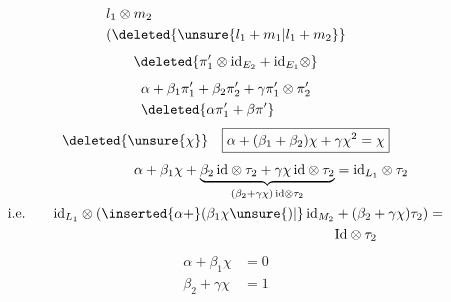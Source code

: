 \[
\begin{aligned}
&l_1\otimes m_2\\
&(\deleted{\unsure{l_1+m_1|l_1+m_2}}
\end{aligned}
\]
\[
\deleted{\pi'_1\otimes\mathrm{id}_{E_2}+\mathrm{id}_{E_1}\otimes}
\]
\[
\begin{aligned}
&\alpha+\beta_1\pi'_1+\beta_2\pi'_2+\gamma\pi'_1\otimes\pi'_2\\
&\deleted{\alpha\pi'_1+\beta\pi'}
\end{aligned}
\]
\[
\deleted{\unsure{\chi}}\quad\boxed{\alpha+(\beta_1+\beta_2)\chi+\gamma\chi^2=\chi}
\]
\[
\begin{aligned}
\alpha+\beta_1\chi+
\underbrace{\beta_2\,\mathrm{id}\otimes\tau_2+\gamma\chi\,\mathrm{id}\otimes\tau_2}_{(\beta_2+\gamma\chi)\,\mathrm{id}\otimes\tau_2}
&=\mathrm{id}_{L_1}\otimes\tau_2\\
\text{i.e.}\qquad \mathrm{id}_{L_1}\otimes(\inserted{\alpha+}(\beta_1\chi\unsure{)|{}}\,\mathrm{id}_{M_2}
&+(\beta_2+\gamma\chi)\tau_2)=\\
&\mathrm{Id}\otimes\tau_2
\end{aligned}
\]
\[
\boxed{\begin{aligned}
\alpha+\beta_1\chi&=0\\
\beta_2+\gamma\chi&=1
\end{aligned}}
\]

